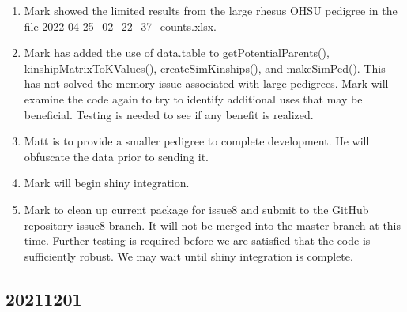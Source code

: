 \documentclass[
]{article}
\providecommand{\tightlist}{%
  \setlength{\itemsep}{0pt}\setlength{\parskip}{0pt}}
\begin{document}
\begin{enumerate}
\def\labelenumi{\arabic{enumi}.}
\tightlist
\item
  Mark showed the limited results from the large rhesus OHSU pedigree in
  the file 2022-04-25\_02\_22\_37\_counts.xlsx.
\item
  Mark has added the use of data.table to getPotentialParents(),
  kinshipMatrixToKValues(), createSimKinships(), and makeSimPed(). This
  has not solved the memory issue associated with large pedigrees. Mark
  will examine the code again to try to identify additional uses that
  may be beneficial. Testing is needed to see if any benefit is
  realized.
\item
  Matt is to provide a smaller pedigree to complete development. He will
  obfuscate the data prior to sending it.
\item
  Mark will begin shiny integration.
\item
  Mark to clean up current package for issue8 and submit to the GitHub
  repository issue8 branch. It will not be merged into the master branch
  at this time. Further testing is required before we are satisfied that
  the code is sufficiently robust. We may wait until shiny integration
  is complete.
\end{enumerate}

\hypertarget{section-2}{%
\subsection{20211201}\label{section-2}}
\end{document}
